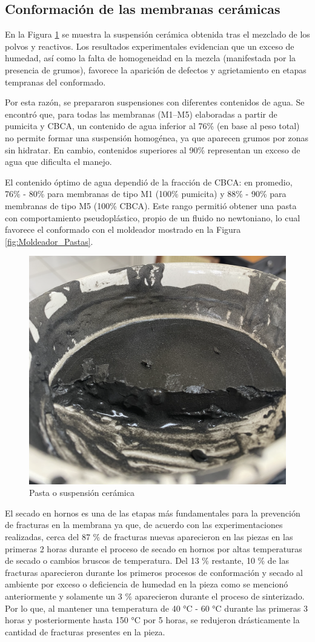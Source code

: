 \documentclass{article}
\begin{document}
\subsection{Conformación de las membranas cerámicas}

En la Figura \ref{fig:Pasta_Cerámica} se muestra la suspensión 
cerámica obtenida tras el mezclado de los polvos y reactivos. 
Los resultados experimentales evidencian que un exceso de humedad, 
así como la falta de homogeneidad en la 
mezcla (manifestada por la presencia de grumos), favorece la 
aparición de defectos y agrietamiento en etapas tempranas del 
conformado.

Por esta razón, se prepararon suspensiones con diferentes contenidos 
de agua. Se encontró que, para todas las membranas (M1–M5) 
elaboradas a partir de pumicita y CBCA, un contenido de agua 
inferior al 76\% (en base al peso total) no permite formar una 
suspensión homogénea, ya que aparecen grumos por zonas sin hidratar. 
En cambio, contenidos superiores al 90\% representan un exceso de 
agua que dificulta el manejo.

El contenido óptimo de agua dependió de la fracción de CBCA: en 
promedio, 76\% - 80\% para membranas de tipo M1 (100\% pumicita) y 
88\% - 90\% para membranas de tipo M5 (100\% CBCA). Este rango 
permitió obtener una pasta con comportamiento pseudoplástico, propio 
de un fluido no newtoniano, lo cual favorece el conformado con el 
moldeador mostrado en la Figura \ref{fig:Moldeador_Pastas}.

\begin{figure}[ht]
    \centering
    \includegraphics[width=0.5\linewidth]{Graphics/Suspension ceramica.png}
    \caption{Pasta o suspensión cerámica}
    \label{fig:Pasta_Cerámica}
\end{figure}

El secado en hornos es una de las etapas más fundamentales para la 
prevención de fracturas en la membrana ya que, de acuerdo con las 
experimentaciones realizadas, cerca del 87 \% de fracturas nuevas 
aparecieron en las piezas en las primeras 2 horas durante el proceso 
de secado en hornos por altas temperaturas de secado o cambios bruscos 
de temperatura. Del 13 \% restante, 10 \% de las fracturas aparecieron 
durante los primeros procesos de conformación y secado al ambiente por 
exceso o deficiencia de humedad en la pieza como se mencionó anteriormente 
y solamente un 3 \% aparecieron durante el proceso de sinterizado. 
Por lo que, al mantener una temperatura de 40 °C - 60 °C durante las 
primeras 3 horas y posteriormente hasta 150 °C por 5 horas, 
se redujeron drásticamente la cantidad de fracturas presentes en la 
pieza. 
 
\end{document}
